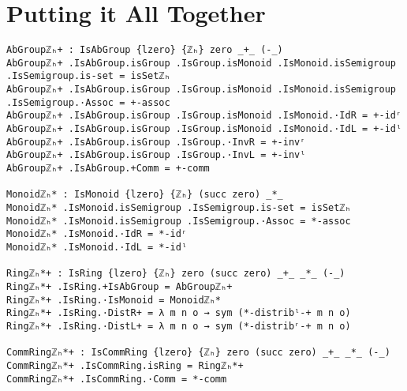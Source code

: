 \section{Putting it All Together}
\begin{verbatim}
AbGroupℤₕ+ : IsAbGroup {lzero} {ℤₕ} zero _+_ (-_)
AbGroupℤₕ+ .IsAbGroup.isGroup .IsGroup.isMonoid .IsMonoid.isSemigroup .IsSemigroup.is-set = isSetℤₕ
AbGroupℤₕ+ .IsAbGroup.isGroup .IsGroup.isMonoid .IsMonoid.isSemigroup .IsSemigroup.·Assoc = +-assoc
AbGroupℤₕ+ .IsAbGroup.isGroup .IsGroup.isMonoid .IsMonoid.·IdR = +-idʳ
AbGroupℤₕ+ .IsAbGroup.isGroup .IsGroup.isMonoid .IsMonoid.·IdL = +-idˡ
AbGroupℤₕ+ .IsAbGroup.isGroup .IsGroup.·InvR = +-invʳ
AbGroupℤₕ+ .IsAbGroup.isGroup .IsGroup.·InvL = +-invˡ
AbGroupℤₕ+ .IsAbGroup.+Comm = +-comm

Monoidℤₕ* : IsMonoid {lzero} {ℤₕ} (succ zero) _*_
Monoidℤₕ* .IsMonoid.isSemigroup .IsSemigroup.is-set = isSetℤₕ
Monoidℤₕ* .IsMonoid.isSemigroup .IsSemigroup.·Assoc = *-assoc
Monoidℤₕ* .IsMonoid.·IdR = *-idʳ
Monoidℤₕ* .IsMonoid.·IdL = *-idˡ

Ringℤₕ*+ : IsRing {lzero} {ℤₕ} zero (succ zero) _+_ _*_ (-_)
Ringℤₕ*+ .IsRing.+IsAbGroup = AbGroupℤₕ+
Ringℤₕ*+ .IsRing.·IsMonoid = Monoidℤₕ*
Ringℤₕ*+ .IsRing.·DistR+ = λ m n o → sym (*-distribˡ-+ m n o)
Ringℤₕ*+ .IsRing.·DistL+ = λ m n o → sym (*-distribʳ-+ m n o)

CommRingℤₕ*+ : IsCommRing {lzero} {ℤₕ} zero (succ zero) _+_ _*_ (-_)
CommRingℤₕ*+ .IsCommRing.isRing = Ringℤₕ*+
CommRingℤₕ*+ .IsCommRing.·Comm = *-comm
\end{verbatim}
